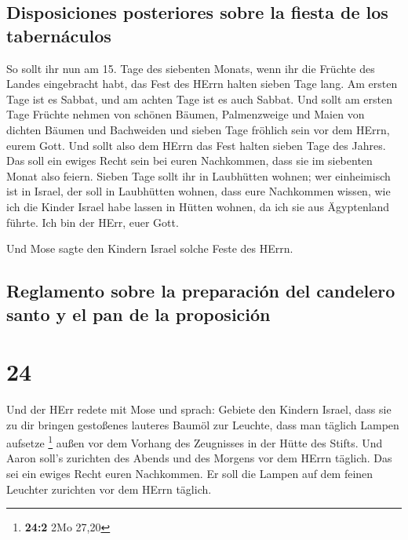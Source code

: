 \hypertarget{disposiciones-posteriores-sobre-la-fiesta-de-los-tabernuxe1culos}{%
\subsection{Disposiciones posteriores sobre la fiesta de los
tabernáculos}\label{disposiciones-posteriores-sobre-la-fiesta-de-los-tabernuxe1culos}}

 So sollt ihr nun am 15. Tage des siebenten Monats, wenn
ihr die Früchte des Landes eingebracht habt, das Fest des HErrn halten
sieben Tage lang. Am ersten Tage ist es Sabbat, und am achten Tage ist
es auch Sabbat.  Und sollt am ersten Tage Früchte nehmen
von schönen Bäumen, Palmenzweige und Maien von dichten Bäumen und
Bachweiden und sieben Tage fröhlich sein vor dem HErrn, eurem Gott.
 Und sollt also dem HErrn das Fest halten sieben Tage des
Jahres. Das soll ein ewiges Recht sein bei euren Nachkommen, dass sie im
siebenten Monat also feiern.  Sieben Tage sollt ihr in
Laubhütten wohnen; wer einheimisch ist in Israel, der soll in Laubhütten
wohnen,  dass eure Nachkommen wissen, wie ich die Kinder
Israel habe lassen in Hütten wohnen, da ich sie aus Ägyptenland führte.
Ich bin der HErr, euer Gott.

 Und Mose sagte den Kindern Israel solche Feste des
HErrn.

\hypertarget{reglamento-sobre-la-preparaciuxf3n-del-candelero-santo-y-el-pan-de-la-proposiciuxf3n}{%
\subsection{Reglamento sobre la preparación del candelero santo y el pan
de la
proposición}\label{reglamento-sobre-la-preparaciuxf3n-del-candelero-santo-y-el-pan-de-la-proposiciuxf3n}}

\hypertarget{section-23}{%
\section{24}\label{section-23}}

 Und der HErr redete mit Mose und sprach: 
Gebiete den Kindern Israel, dass sie zu dir bringen gestoßenes lauteres
Baumöl zur Leuchte, dass man täglich Lampen aufsetze \footnote{\textbf{24:2}
  2Mo 27,20}  außen vor dem Vorhang des Zeugnisses in der
Hütte des Stifts. Und Aaron soll's zurichten des Abends und des Morgens
vor dem HErrn täglich. Das sei ein ewiges Recht euren Nachkommen.
 Er soll die Lampen auf dem feinen Leuchter zurichten vor
dem HErrn täglich.

